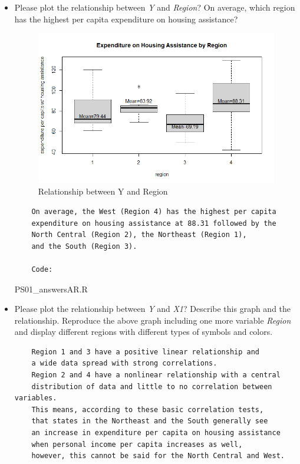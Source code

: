 \documentclass[12pt,letterpaper]{article}
\begin{document}
\begin{itemize}
\begin{Verbatim}
 Code:
\end{Verbatim}
	 {PS01_answersAR.R}
\item
Please plot the relationship between \emph{Y} and \emph{Region}? On average, which region has the highest per capita expenditure on housing assistance?
\begin{figure}[h!]\centering
	\caption{\footnotesize Relationship between Y and Region}
	\label{fig:plot_2}
	\includegraphics[width=.85\textwidth]{boxplot_yandregion.png}
\end{figure}
\begin{Verbatim}
	On average, the West (Region 4) has the highest per capita 
	expenditure on housing assistance at 88.31 followed by the
	North Central (Region 2), the Northeast (Region 1), 
	and the South (Region 3).
	
	Code:
\end{Verbatim}
	 {PS01_answersAR.R}
\item
Please plot the relationship between \emph{Y} and \emph{X1}? Describe this graph and the relationship. Reproduce the above graph including one more variable \emph{Region} and display different regions with different types of symbols and colors.
 \begin{Verbatim}
	Region 1 and 3 have a positive linear relationship and
	a wide data spread with strong correlations.
	Region 2 and 4 have a nonlinear relationship with a central 
	distribution of data and little to no correlation between variables.
	This means, according to these basic correlation tests,
	that states in the Northeast and the South generally see
	an increase in expenditure per capita on housing assistance 
	when personal income per capita increases as well, 
	however, this cannot be said for the North Central and West.
	

\end{Verbatim}
\end{itemize}
\end{document}
